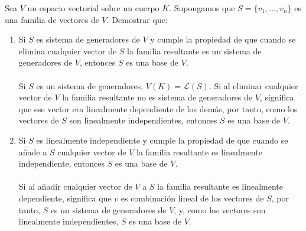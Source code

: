 \begin{ejercicio} Sea \( V \) un espacio vectorial sobre un cuerpo \( K \). Supongamos que \( S = \{v_1, \ldots, v_n\} \) es una familia de vectores de \( V \). Demostrar que:
	\begin{enumerate}
		\item Si \( S \) es sistema de generadores de \( V \) y cumple la propiedad de que cuando se elimina cualquier vector de \( S \) la familia resultante es un sistema de generadores de \( V \), entonces \( S \) es una base de \( V \).
		\\ \\
        Si $S$ es un sistema de generadores, $V(K) = \mathcal{L}(S)$. Si al eliminar cualquier vector de $V$ la familia 
        resultante no es sistema de generadores de $V$, significa que ese vector era linealmente dependiente de los demás,
        por tanto, como los vectores de $S$ son linealmente independientes, entonces $S$ es una base de $V$.
        \item Si \( S \) es linealmente independiente y cumple la propiedad de que cuando se añade a \( S \) cualquier vector de \( V \) la familia resultante es linealmente independiente, entonces \( S \) es una base de \( V \).
        \\ \\
        Si al añadir cualquier vector de $V$ a $S$ la familia resultante es linealmente dependiente, significa que $v$ es combinación 
        lineal de los vectores de $S$, por tanto, $S$ es un sistema de generadores de $V$, y, como los vectores son linealmente independientes,
         $S$ es una base de $V$.
    \end{enumerate}
\end{ejercicio}




